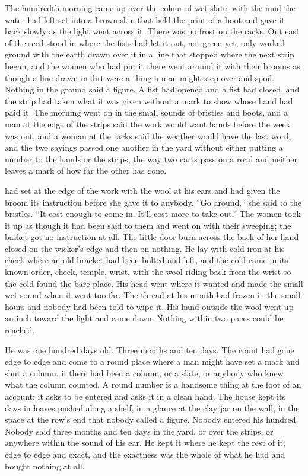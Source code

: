 
The hundredth morning came up over  the colour of wet slate, with the mud the water had left set into a brown skin that held the print of a boot and gave it back slowly as the light went across it. There was no frost on the racks. Out east of  the seed stood in  where the fists had let it out, not green yet, only worked ground with the earth drawn over it in a line that stopped where the next strip began, and the women who had put it there went around it with their brooms as though a line drawn in dirt were a thing a man might step over and spoil. Nothing in the ground said a figure. A fist had opened and a fist had closed, and the strip had taken what it was given without a mark to show whose hand had paid it. The morning went on in the small sounds of bristles and boots, and a man at the edge of the strips said the work would want hands before the week was out, and a woman at the racks said the weather would have the last word, and the two sayings passed one another in the yard without either putting a number to the hands or the strips, the way two carts pass on a road and neither leaves a mark of how far the other has gone.

 had set  at the edge of the work with the wool at his ears and had given the broom its instruction before she gave it to anybody. “Go around,” she said to the bristles. “It cost enough to come in. It'll cost more to take out.” The women took it up as though it had been said to them and went on with their sweeping; the basket got no instruction at all. The little-door burn across the back of her hand closed on the wicker's edge and then on nothing. He lay with cold iron at his cheek where an old bracket had been bolted and left, and the cold came in its known order, cheek, temple, wrist, with the wool riding back from the wrist so the cold found the bare place. His head went where it wanted and made the small wet sound when it went too far. The thread at his mouth had frozen in the small hours and nobody had been told to wipe it. His hand outside the wool went up an inch toward the light and came down. Nothing within two paces could be reached.

He was one hundred days old. Three months and ten days. The count had gone edge to edge and come to a round place where a man might have set a mark and shut a column, if there had been a column, or a slate, or anybody who knew what the column counted. A round number is a handsome thing at the foot of an account; it asks to be entered and asks it in a clean hand. The house kept its days in loaves pushed along a shelf, in a glance at the clay jar on the wall, in the space at the row's end that nobody called a figure. Nobody entered his hundred. Nobody said three months and ten days in the yard, or over the strips, or anywhere within the sound of his ear. He kept it where he kept the rest of it, edge to edge and exact, and the exactness was the whole of what he had and bought nothing at all.

